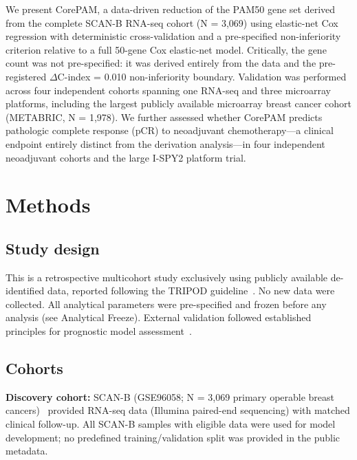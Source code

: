 \documentclass[referee,lineno,pdflatex,sn-vancouver-num]{sn-jnl}
\begin{document}
We present CorePAM, a data-driven reduction of the PAM50 gene set derived from the complete SCAN-B RNA-seq cohort (N = 3,069) using elastic-net Cox regression with deterministic cross-validation and a pre-specified non-inferiority criterion relative to a full 50-gene Cox elastic-net model. Critically, the gene count was not pre-specified: it was derived entirely from the data and the pre-registered $\Delta$C-index = 0.010 non-inferiority boundary. Validation was performed across four independent cohorts spanning one RNA-seq and three microarray platforms, including the largest publicly available microarray breast cancer cohort (METABRIC, N = 1,978). We further assessed whether CorePAM predicts pathologic complete response (pCR) to neoadjuvant chemotherapy---a clinical endpoint entirely distinct from the derivation analysis---in four independent neoadjuvant cohorts and the large I-SPY2 platform trial.

\section{Methods}\label{sec:methods}

\subsection{Study design}\label{subsec:study-design}

This is a retrospective multicohort study exclusively using publicly available de-identified data, reported following the TRIPOD guideline~\cite{moons2015}. No new data were collected. All analytical parameters were pre-specified and frozen before any analysis (see Analytical Freeze). External validation followed established principles for prognostic model assessment~\cite{royston2004}.

\subsection{Cohorts}\label{subsec:cohorts}

\textbf{Discovery cohort:} SCAN-B (GSE96058; N = 3,069 primary operable breast cancers)~\cite{brueffer2018,saal2015} provided RNA-seq data (Illumina paired-end sequencing) with matched clinical follow-up. All SCAN-B samples with eligible data were used for model development; no predefined training/validation split was provided in the public metadata.
\end{document}
